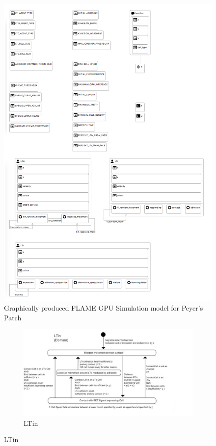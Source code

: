\documentclass{UoYCSproject}
\begin{document}
\begin{figure}[htp]
\centering
\includegraphics[width=\textwidth]{Appendix/ppsim_gmf}
\caption{Graphically produced \gls{FLAME GPU} Simulation model for Peyer's Patch}
\label{fig:ppsim_gmf}
\end{figure}

\begin{figure}[htp]
\centering
\begin{subfigure}{0.95\textwidth}
\centering
\includegraphics[width=\textwidth]{Appendix/Models/Domain/LTin}
\caption{LTin}
\end{subfigure}
\end{figure}
\end{document}
